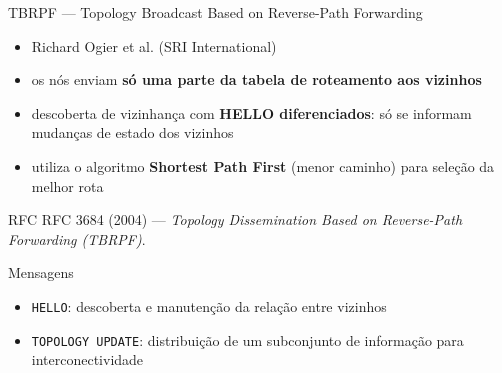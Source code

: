 \documentclass[aspectratio=169,11pt]{beamer}
\begin{document}
\begin{frame}{TBRPF --- Topology Broadcast Based on Reverse-Path Forwarding}
  \begin{itemize}
    \item Richard Ogier et al. (SRI International)
    \item os nós enviam \textbf{só uma parte da tabela de roteamento aos vizinhos}
    \item descoberta de vizinhança com \textbf{HELLO diferenciados}: só se informam mudanças de estado dos vizinhos
    \item utiliza o algoritmo \textbf{Shortest Path First} (menor caminho) para seleção da melhor rota
  \end{itemize}
  \begin{exampleblock}{RFC}
    RFC 3684 (2004) --- \emph{Topology Dissemination Based on Reverse-Path Forwarding (TBRPF)}.
  \end{exampleblock}
  \begin{block}{Mensagens}
    \begin{itemize}
      \item \texttt{HELLO}: descoberta e manutenção da relação entre vizinhos
      \item \texttt{TOPOLOGY UPDATE}: distribuição de um subconjunto de informação para interconectividade
    \end{itemize}
  \end{block}
\end{frame}
\end{document}
